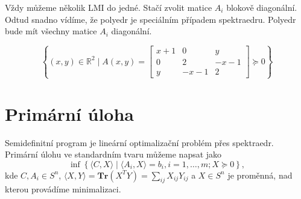 Vždy můžeme několik LMI  do jedné. Stačí zvolit matice $A_i$ blokově diagonální. Odtud snadno vídíme, že polyedr je speciálním případem spektraedru. Polyedr bude mít všechny matice $A_i$ diagonální.

\begin{pr}
    $$
        \left\{ (x, y) \in \mathbb{R}^2 \mid A(x,y) =
        \begin{bmatrix}
            x + 1 & 0      & y \\
            0     & 2      & -x - 1 \\
            y     & -x - 1 & 2
        \end{bmatrix}
        \succeq 0 \right\}
    $$
\end{pr}

\section{Primární úloha}

Semidefinitní program je lineární optimalizační problém přes spektraedr. Primární úlohu ve standardním tvaru můžeme napsat jako
\begin{equation}\tag{SDP-P}
    \inf \left\{ \langle C, X \rangle \mid \langle A_i, X \rangle = b_i, i=1, \dots, m; X \succeq 0 \right\},
    \label{eq:SDP-P}
\end{equation}
kde $C, A_i \in S^n$, $\langle X, Y \rangle = \textbf{Tr}(X^T Y) = \sum_{ij} X_{ij}Y_{ij}$ a $X \in S^n$ je proměnná, nad kterou provádíme minimalizaci.

